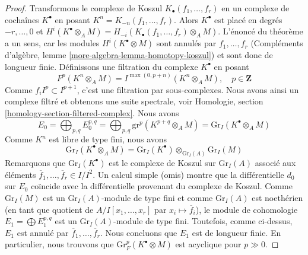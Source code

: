 \begin{proof}
Transformons le complexe de Koszul $K_\bullet(f_1, \ldots, f_r)$ en un complexe de
cochaînes $K^\bullet$ en posant $K^n = K_{-n}(f_1, \ldots, f_r)$.
Alors $K^\bullet$ est placé en degrés $-r, \ldots, 0$ et
$H^i(K^\bullet \otimes_A M) = H_{-i}(K_\bullet(f_1, \ldots, f_r) \otimes_A M)$.
L'énoncé du théorème a un sens, car les modules
$H^i(K^\bullet \otimes M)$ sont annulés par $f_1, \ldots, f_r$
(Compléments d'algèbre, lemme \ref{more-algebra-lemma-homotopy-koszul})
et sont donc de longueur finie.
Définissons une filtration du complexe $K^\bullet$ en posant
$$
F^p(K^n \otimes_A M) =
I^{\max(0, p + n)}(K^n \otimes_A M),\quad p \in \mathbf{Z}
$$
Comme $f_i I^p \subset I^{p + 1}$, c'est une filtration par sous-complexes.
Nous avons ainsi un complexe filtré et obtenons une suite spectrale, voir
Homologie, section \ref{homology-section-filtered-complex}.
Nous avons
$$
E_0 = \bigoplus\nolimits_{p, q} E_0^{p, q} =
\bigoplus\nolimits_{p, q} \text{gr}^p(K^{p + q} \otimes_A M) =
\text{Gr}_I(K^\bullet \otimes_A M)
$$
Comme $K^n$ est libre de type fini, nous avons
$$
\text{Gr}_I(K^\bullet \otimes_A M) =
\text{Gr}_I(K^\bullet) \otimes_{\text{Gr}_I(A)} \text{Gr}_I(M)
$$
Remarquons que $\text{Gr}_I(K^\bullet)$ est le complexe de Koszul
sur $\text{Gr}_I(A)$ associé aux éléments
$\overline{f}_1, \ldots, \overline{f}_r \in I/I^2$.
Un calcul simple (omis)
montre que la différentielle $d_0$ sur $E_0$
coïncide avec la différentielle provenant du complexe de Koszul.
Comme $\text{Gr}_I(M)$ est un $\text{Gr}_I(A)$-module de type fini
et comme $\text{Gr}_I(A)$ est noethérien (en tant que quotient
de $A/I[x_1, \ldots, x_r]$ par $x_i \mapsto \overline{f}_i$), le
module de cohomologie $E_1 = \bigoplus E_1^{p, q}$
est un $\text{Gr}_I(A)$-module de type fini. Toutefois, comme ci-dessus,
$E_1$ est annulé par $\overline{f}_1, \ldots, \overline{f}_r$.
Nous concluons que $E_1$ est de longueur finie.
En particulier, nous trouvons que $\text{Gr}^p_F(K^\bullet \otimes M)$ est
acyclique pour $p \gg 0$.


\end{proof}
